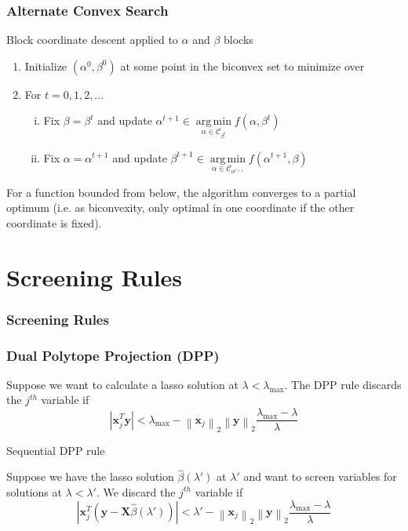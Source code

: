 \documentclass{beamer}
\newcommand{\Norm}[1]{\left\lVert#1\right\rVert}
\newcommand{\norm}[1]{\left\lvert#1\right\rvert}
\DeclareMathOperator*{\argmin}{arg\,min}
\begin{document}
\begin{frame}
\frametitle{Alternate Convex Search}

Block coordinate descent applied to $\alpha$ and $\beta$ blocks
\begin{enumerate}
\item Initialize $(\alpha^0,\beta^0)$ at some point in the biconvex set to minimize over
\item For $t=0,1,2,\dots$
	\begin{enumerate}[(i)]
	\item Fix $\beta=\beta^t$ and update $\alpha^{t+1}\in\argmin\limits_{\alpha\in\mathcal{C}_{\beta^t}}f(\alpha,\beta^t)$
	\item Fix $\alpha=\alpha^{t+1}$ and update $\beta^{t+1}\in\argmin\limits_{\alpha\in\mathcal{C}_{\alpha^{t+1}}}f(\alpha^{t+1},\beta)$
	\end{enumerate}
\end{enumerate}
\vspace{10pt}

For a function bounded from below, the algorithm converges to a partial optimum (i.e. as biconvexity, only optimal in one coordinate if the other coordinate is fixed).
\end{frame}

\section{Screening Rules}

\begin{frame}
\frametitle{Screening Rules}


\end{frame}


\begin{frame}
\frametitle{Dual Polytope Projection (DPP)}
Suppose we want to calculate a lasso solution at $\lambda<\lambda_{\max}$. The DPP rule discards the $j^{th}$ variable if 
\[\norm{\mathbf{x}_j^T\mathbf{y}}<\lambda_{\max}-\Norm{\mathbf{x}_j}_2\Norm{\mathbf{y}}_2\frac{\lambda_{\max}-\lambda}{\lambda}\]

\vspace{5pt}
{\hspace{5pt}\Large Sequential DPP rule}
\vspace{15pt}

Suppose we have the lasso solution $\hat\beta(\lambda')$ at $\lambda'$ and want to screen variables for solutions at $\lambda<\lambda'$. We discard the $j^{th}$ variable if 
\[\norm{\mathbf{x}_j^T(\mathbf{y}-\mathbf{X}\hat{\beta}(\lambda'))}<\lambda'-\Norm{\mathbf{x}_j}_2\Norm{\mathbf{y}}_2\frac{\lambda_{\max}-\lambda}{\lambda}\]
\end{frame}
\end{document}
